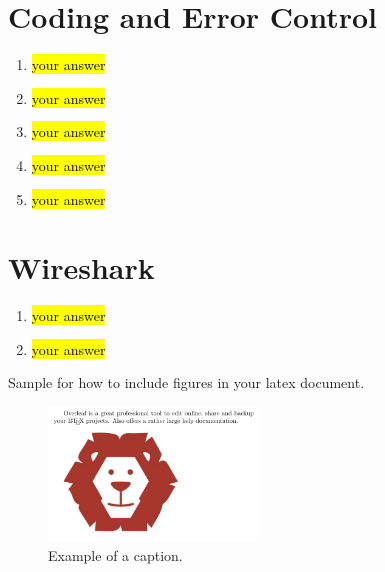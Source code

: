\documentclass[11pt]{article}
\begin{document}
\section{Coding and Error Control}
\begin{enumerate}[label=(\alph*)]
\item \hl{your answer}
\item \hl{your answer}
\item \hl{your answer}
\item \hl{your answer}
\item \hl{your answer} 
\end{enumerate}

\section{Wireshark}
\begin{enumerate}[label=(\alph*)]
\item \hl{your answer}
\item \hl{your answer}
\end{enumerate}


Sample for how to include figures in your latex document.
\begin{figure}[h] %
\centering
\includegraphics[width=0.5\textwidth]{lion-logo}
\caption{Example of a caption.}
\end{figure}
\end{document}
